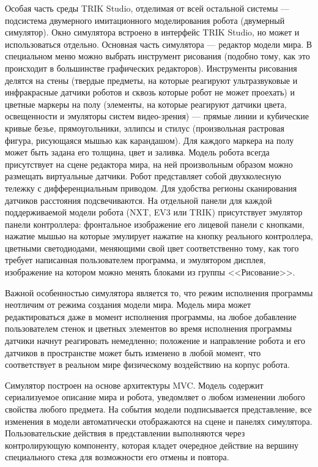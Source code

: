 \documentclass[conference]{IEEEtran}
\begin{document}
Особая часть среды TRIK Studio, отделимая от всей остальной системы --- подсистема двумерного имитационного моделирования робота (двумерный симулятор). Окно симулятора встроено в интерфейс TRIK Studio, но может и использоваться отдельно. Основная часть симулятора --- редактор модели мира. В специальном меню можно выбрать инструмент рисования (подобно тому, как это происходит в большинстве графических редакторов). Инструменты рисования делятся на стены (твердые предметы, на которые реагируют ультразвуковые и инфракрасные датчики роботов и сквозь которые робот не может проехать) и цветные маркеры на полу (элементы, на которые реагируют датчики цвета, освещенности и эмуляторы систем видео-зрения) --- прямые линии и кубические кривые безье, прямоугольники, эллипсы и стилус (произвольная растровая фигура, рисующаяся мышью как карандашом). Для каждого маркера на полу может быть задана его толщина, цвет и заливка. Модель робота всегда присутствует на сцене редактора мира, на ней произвольным образом можно размещать виртуальные датчики. Робот представляет собой двухколесную тележку с дифференциальным приводом. Для удобства регионы сканирования датчиков расстояния подсвечиваются. На отдельной панели для каждой поддерживаемой модели робота (NXT, EV3 или TRIK) присутствует эмулятор панели контроллера: фронтальное изображение его лицевой панели с кнопками, нажатие мышью на которые эмулирует нажатие на кнопку реального контроллера, цветными светодиодами, меняющими свой цвет соответственно тому, как того требует написанная пользователем программа, и эмулятором дисплея, изображение на котором можно менять блоками из группы <<Рисование>>.

Важной особенностью симулятора является то, что режим исполнения программы неотличим от режима создания модели мира. Модель мира может редактироваться даже в момент исполнения программы, на любое добавление пользователем стенок и цветных элементов во время исполнения программы датчики начнут реагировать немедленно; положение и направление робота и его датчиков в пространстве может быть изменено в любой момент, что соответствует в реальном мире физическому воздействию на корпус робота.

Симулятор построен на основе архитектуры MVC. Модель содержит сериализуемое описание мира и робота, уведомляет о любом изменении любого свойства любого предмета. На события модели подписывается представление, все изменения в модели автоматически отображаются на сцене и панелях симулятора. Пользовательские действия в представлении выполняются через контролирующую компоненту, которая кладет очередное действие на вершину специального стека для возможности его отмены и повтора.
\end{document}
